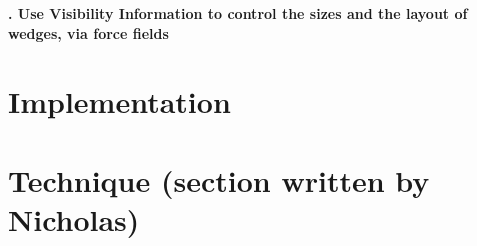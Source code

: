 \documentclass[review,journal]{vgtc}         %
\begin{document}
\textbf{. Use Visibility Information to control the sizes and the layout of wedges, via force fields}




\section{Implementation}

%
%
%
%
%
%



\section{Technique (section written by Nicholas)}
\end{document}
